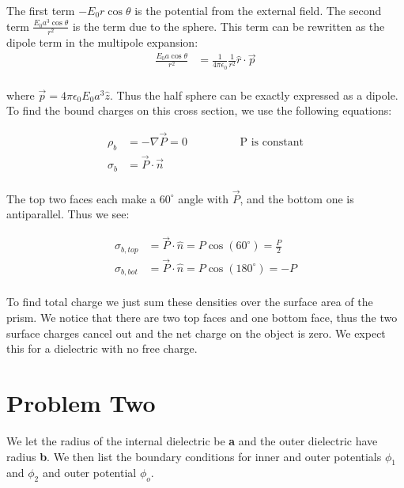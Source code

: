 \documentclass[10pt]{article} %
\begin{document}
The first term $-E_0r\cos\theta$ is the potential from the external field. The second term $\frac{E_0a^3\cos\theta}{r^2}$ is the term due
to the sphere. This term can be rewritten as the dipole term in the multipole expansion:\\

\begin{align*}
  \frac{E_0a\cos\theta}{r^2} &= \frac{1}{4\pi\epsilon_0}\frac{1}{r^2} \hat{r} \cdot \vec{p}\\
\end{align*}

where $\vec{p} = 4\pi\epsilon_0E_0 a^3 \hat{z}$. Thus the half sphere can be exactly expressed as a dipole.\\

To find the bound charges on this cross section, we use the following equations:

\begin{align*}
  \rho_b &= -\nabla \vec{P} = 0\hspace{2cm} \mbox{P is constant}\\
  \sigma_b &= \vec{P} \cdot \vec{n}\\
\end{align*}

The top two faces each make a $60^\circ$ angle with $\vec{P}$, and the bottom one is antiparallel. Thus we see:

\begin{align*}
  \sigma_{b,top} &= \vec{P} \cdot \hat{n} = P\cos\left(60^\circ\right) = \frac P2\\
  \sigma_{b,bot} &= \vec{P} \cdot \hat{n} = P\cos\left(180^\circ\right) = -P\\
\end{align*}

To find total charge we just sum these densities over the surface area of the prism. We notice that there are two top faces and one
bottom face, thus the two surface charges cancel out and the net charge on the object is zero. We expect this for a dielectric with
no free charge.

\section{Problem Two}
We let the radius of the internal dielectric be \textbf{a} and the outer dielectric have radius \textbf{b}. We then list the
boundary conditions for inner and outer potentials $\phi_1$ and $\phi_2$ and outer potential $\phi_o$.\\
\end{document}
